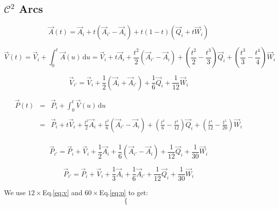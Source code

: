 \documentclass[aps,12pt]{revtex4}
\begin{document}
\subsection{$\mathcal{C}^2$ Arcs}

\begin{equation}
	\vec{A}(t) = \vec{A}_i + t\left(\vec{A}_{i'}-\vec{A}_{i}\right) + t(1-t)(\vec{Q}_i+t\vec{W}_i)
\end{equation}

\begin{equation}
	\vec{V}(t) =  \vec{V}_i + \int_0^t \vec{A}(u) \, \mathrm{d} u 
	= \vec{V}_i + t \vec{A}_i + \frac{t^2}{2} \left(\vec{A}_{i'}-\vec{A}_{i}\right) 
	+ \left(\frac{t^2}{2} - \frac{t^3}{3}\right)  \vec{Q}_i 
	+ \left(\frac{t^3}{3} - \frac{t^4}{4}\right)  \vec{W}_i
	\end{equation}

\begin{equation}
\label{eq:v}
\boxed{
	\vec{V}_{i'} = \vec{V}_i + \frac{1}{2} \left( \vec{A}_{i}+\vec{A}_{i'}\right) + \frac{1}{6}\vec{Q}_i + \frac{1}{12}\vec{W}_i
	}
\end{equation}

\begin{equation}
\begin{array}{rcl}
	\vec{P}(t) &=& \displaystyle \vec{P}_i + \int_0^t \vec{V}(u) \, \mathrm{d} u \\
	\\
	& = & \displaystyle \vec{P}_i + t \vec{V}_i + \frac{t^2}{2} \vec{A}_i + \frac{t^3}{6}  \left(\vec{A}_{i'}-\vec{A}_{i}\right) 
	+ \left(\frac{t^3}{6} - \frac{t^4}{12}\right)  \vec{Q}_i +  \left(\frac{t^4}{12} - \frac{t^5}{20}\right) \vec{W}_i\\
\end{array}
\end{equation}

\begin{equation}
	\vec{P}_{i'} = \vec{P}_i + \vec{V}_i + \frac{1}{2} \vec{A}_i + \frac{1}{6} \left(\vec{A}_{i'}-\vec{A}_{i}\right) + \frac{1}{12} \vec{Q}_i + \frac{1}{30} \vec{W}_i
\end{equation}

\begin{equation}
\label{eq:p}
\boxed{
	\vec{P}_{i'} = \vec{P}_i + \vec{V}_i + \frac{1}{3} \vec{A}_i + \frac{1}{6}  \vec{A}_{i'}  + \frac{1}{12} \vec{Q}_i + \frac{1}{30} \vec{W}_i
	}
\end{equation}

We use $12 \times $Eq.\eqref{eq:v} and $60 \times $Eq.\eqref{eq:p} to get:
\begin{equation}
\left\lbrace
\begin{array}{rcl}
\end{array}
\right.
\end{equation}
\end{document}
